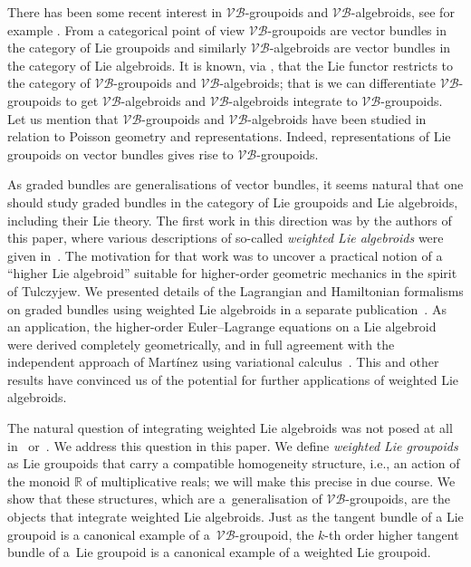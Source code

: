 \documentclass[pdftex]{sigma}
\numberwithin{equation}{section}
\begin{document}
There has been some recent interest in $\mathcal{VB}$-groupoids and $\mathcal{VB}$-algebroids, see for example \cite{Brahic:2014,Bursztyn:2014,Gracia-Saz:2009,Gracia-Saz:2010}.  From a categorical point of view $\mathcal{VB}$-groupoids are vector bundles in the category of Lie groupoids and similarly $\mathcal{VB}$-algebroids are vector bundles in the category of Lie algebroids.   It is known, via \cite{Brahic:2014,Bursztyn:2014}, that the Lie functor restricts to the category of  $\mathcal{VB}$-groupoids and $\mathcal{VB}$-algebroids; that is we can dif\/ferentiate  $\mathcal{VB}$-groupoids to get $\mathcal{VB}$-algebroids and $\mathcal{VB}$-algebroids integrate to $\mathcal{VB}$-groupoids. Let us mention that $\mathcal{VB}$-groupoids and  $\mathcal{VB}$-algebroids have been studied in relation to Poisson geometry and representations. Indeed, representations of Lie groupoids on vector bundles gives rise to $\mathcal{VB}$-groupoids.

As graded bundles are generalisations of vector bundles, it seems natural that one should study graded bundles in the category of Lie groupoids and  Lie algebroids, including their Lie theory. The f\/irst work in this direction was by the authors of this paper, where various descriptions of so-called \emph{weighted Lie algebroids} were given in~\cite{Bruce:2014}. The motivation for that work was to uncover a practical notion of a ``higher Lie algebroid'' suitable for higher-order geometric mechanics in the spirit of Tulczyjew. We presented details of the Lagrangian and Hamiltonian formalisms on graded bundles using weighted Lie algebroids in a separate publication~\cite{Bruce:2014b}. As an application, the higher-order Euler--Lagrange equations on a Lie algebroid were derived completely geometrically, and in full agreement with the independent   approach of Mart\'{i}nez using variational calculus~\cite{Martinez:2015}. This and other results have convinced us of the potential for further applications of weighted Lie algebroids.

The natural question of integrating weighted Lie algebroids was not posed at all in~\cite{Bruce:2014} or~\cite{Bruce:2014b}. We address this question in this paper. We  def\/ine \emph{weighted Lie groupoids} as Lie groupoids that carry a compatible homogeneity structure, i.e., an action of the monoid ${\mathbb R}$ of multiplicative reals; we will make this precise in due course.   We show that these structures, which are a~generalisation of $\mathcal{VB}$-groupoids, are the objects that integrate weighted Lie algebroids.   Just as the tangent bundle of a Lie groupoid is a canonical example of a~$\mathcal{VB}$-groupoid,  the $k$-th order  higher tangent bundle of a~Lie groupoid is a canonical example of a weighted Lie groupoid.
\end{document}
